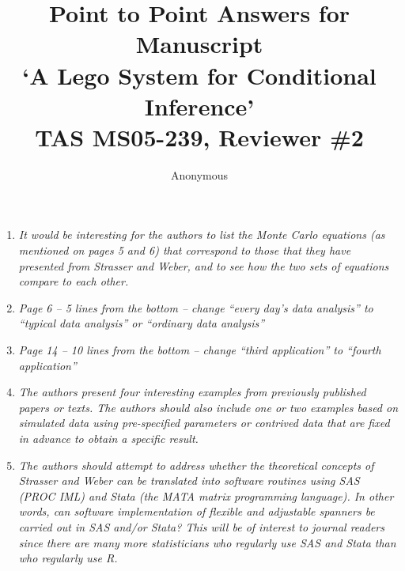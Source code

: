 \documentclass[11pt]{article}
\begin{document}
\title{Point to Point Answers for Manuscript \\
`A Lego System for Conditional Inference' \\
TAS MS05-239, Reviewer \#2}
\author{Anonymous}
\maketitle

\begin{enumerate}

\item \textsl{It would be interesting for the authors to list the Monte Carlo equations
              (as mentioned on pages 5 and 6) that correspond to those that they have 
              presented from Strasser and Weber, and to see how the two sets of equations 
              compare to each other.}

\item \textsl{Page 6 – 5 lines from the bottom – change “every day’s data analysis” to
              “typical data analysis” or “ordinary data analysis”}

\item \textsl{Page 14 – 10 lines from the bottom – change “third application” to
              “fourth application”}

\item \textsl{The authors present four interesting examples from previously published
              papers or texts. The authors should also include one or two examples 
              based on simulated data using pre-specified
              parameters or contrived data that are fixed in advance to obtain a specific
              result.}

\item \textsl{The authors should attempt to address whether the theoretical concepts of
              Strasser and Weber can be translated into software routines using 
              SAS (PROC IML) and Stata (the MATA matrix programming language). In other 
              words, can software implementation of flexible and adjustable
              spanners be carried out in SAS and/or Stata? This will be of interest to
              journal readers since there are many more statisticians who regularly use 
              SAS and Stata than who regularly use R.}

\end{enumerate}
\end{document}

